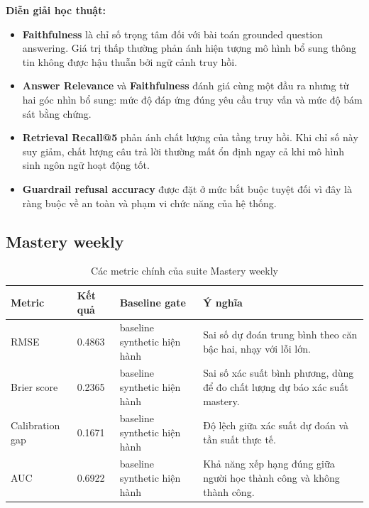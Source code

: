 \documentclass[12pt,a4paper]{article}
\begin{document}
\textbf{Diễn giải học thuật:}
\begin{itemize}
    \item \textbf{Faithfulness} là chỉ số trọng tâm đối với bài toán grounded question answering. Giá trị thấp thường phản ánh hiện tượng mô hình bổ sung thông tin không được hậu thuẫn bởi ngữ cảnh truy hồi.
    \item \textbf{Answer Relevance} và \textbf{Faithfulness} đánh giá cùng một đầu ra nhưng từ hai góc nhìn bổ sung: mức độ đáp ứng đúng yêu cầu truy vấn và mức độ bám sát bằng chứng.
    \item \textbf{Retrieval Recall@5} phản ánh chất lượng của tầng truy hồi. Khi chỉ số này suy giảm, chất lượng câu trả lời thường mất ổn định ngay cả khi mô hình sinh ngôn ngữ hoạt động tốt.
    \item \textbf{Guardrail refusal accuracy} được đặt ở mức bắt buộc tuyệt đối vì đây là ràng buộc về an toàn và phạm vi chức năng của hệ thống.
\end{itemize}

\subsection{Mastery weekly}

\begin{table}[H]
\centering
\small
\begin{tabularx}{\textwidth}{L{3.2cm} L{2.0cm} L{2.1cm} Y}
\toprule
\textbf{Metric} & \textbf{Kết quả} & \textbf{Baseline gate} & \textbf{Ý nghĩa} \\
\midrule
RMSE & 0.4863 & baseline synthetic hiện hành & Sai số dự đoán trung bình theo căn bậc hai, nhạy với lỗi lớn. \\
Brier score & 0.2365 & baseline synthetic hiện hành & Sai số xác suất bình phương, dùng để đo chất lượng dự báo xác suất mastery. \\
Calibration gap & 0.1671 & baseline synthetic hiện hành & Độ lệch giữa xác suất dự đoán và tần suất thực tế. \\
AUC & 0.6922 & baseline synthetic hiện hành & Khả năng xếp hạng đúng giữa người học thành công và không thành công. \\
\bottomrule
\end{tabularx}
\caption{Các metric chính của suite Mastery weekly}
\end{table}
\end{document}
